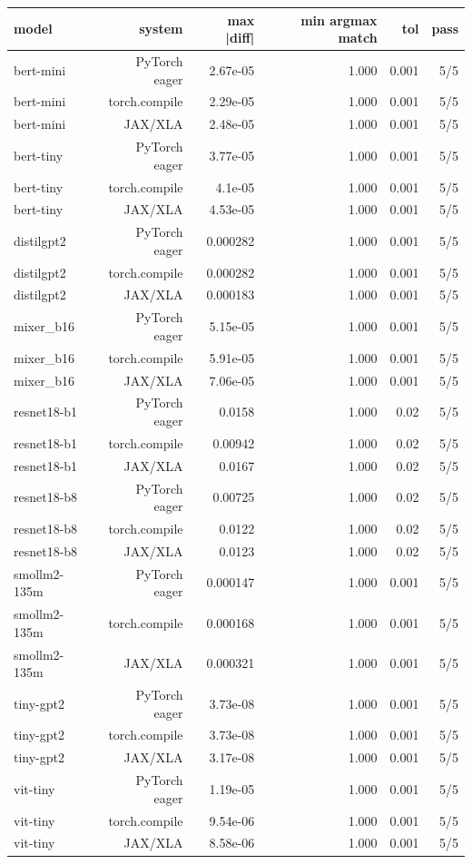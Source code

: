 \begin{tabular}{lrrrrr}
\toprule
model & system & max |diff| & min argmax match & tol & pass \\
\midrule
bert-mini & PyTorch eager & 2.67e-05 & 1.000 & 0.001 & 5/5 \\
bert-mini & torch.compile & 2.29e-05 & 1.000 & 0.001 & 5/5 \\
bert-mini & JAX/XLA & 2.48e-05 & 1.000 & 0.001 & 5/5 \\
bert-tiny & PyTorch eager & 3.77e-05 & 1.000 & 0.001 & 5/5 \\
bert-tiny & torch.compile & 4.1e-05 & 1.000 & 0.001 & 5/5 \\
bert-tiny & JAX/XLA & 4.53e-05 & 1.000 & 0.001 & 5/5 \\
distilgpt2 & PyTorch eager & 0.000282 & 1.000 & 0.001 & 5/5 \\
distilgpt2 & torch.compile & 0.000282 & 1.000 & 0.001 & 5/5 \\
distilgpt2 & JAX/XLA & 0.000183 & 1.000 & 0.001 & 5/5 \\
mixer\_b16 & PyTorch eager & 5.15e-05 & 1.000 & 0.001 & 5/5 \\
mixer\_b16 & torch.compile & 5.91e-05 & 1.000 & 0.001 & 5/5 \\
mixer\_b16 & JAX/XLA & 7.06e-05 & 1.000 & 0.001 & 5/5 \\
resnet18-b1 & PyTorch eager & 0.0158 & 1.000 & 0.02 & 5/5 \\
resnet18-b1 & torch.compile & 0.00942 & 1.000 & 0.02 & 5/5 \\
resnet18-b1 & JAX/XLA & 0.0167 & 1.000 & 0.02 & 5/5 \\
resnet18-b8 & PyTorch eager & 0.00725 & 1.000 & 0.02 & 5/5 \\
resnet18-b8 & torch.compile & 0.0122 & 1.000 & 0.02 & 5/5 \\
resnet18-b8 & JAX/XLA & 0.0123 & 1.000 & 0.02 & 5/5 \\
smollm2-135m & PyTorch eager & 0.000147 & 1.000 & 0.001 & 5/5 \\
smollm2-135m & torch.compile & 0.000168 & 1.000 & 0.001 & 5/5 \\
smollm2-135m & JAX/XLA & 0.000321 & 1.000 & 0.001 & 5/5 \\
tiny-gpt2 & PyTorch eager & 3.73e-08 & 1.000 & 0.001 & 5/5 \\
tiny-gpt2 & torch.compile & 3.73e-08 & 1.000 & 0.001 & 5/5 \\
tiny-gpt2 & JAX/XLA & 3.17e-08 & 1.000 & 0.001 & 5/5 \\
vit-tiny & PyTorch eager & 1.19e-05 & 1.000 & 0.001 & 5/5 \\
vit-tiny & torch.compile & 9.54e-06 & 1.000 & 0.001 & 5/5 \\
vit-tiny & JAX/XLA & 8.58e-06 & 1.000 & 0.001 & 5/5 \\
\bottomrule
\end{tabular}
